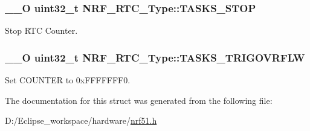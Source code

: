 \subsubsection[{T\+A\+S\+K\+S\+\_\+\+S\+T\+O\+P}]{\setlength{\rightskip}{0pt plus 5cm}\+\_\+\+\_\+\+O uint32\+\_\+t N\+R\+F\+\_\+\+R\+T\+C\+\_\+\+Type\+::\+T\+A\+S\+K\+S\+\_\+\+S\+T\+O\+P}\label{struct_n_r_f___r_t_c___type_a6c251ab88a855ba8c0b8ab21928b0cb2}
Stop R\+T\+C Counter. \hypertarget{struct_n_r_f___r_t_c___type_a08d8aef4b68b48e7ee8be18cbfc19665}{}
\subsubsection[{T\+A\+S\+K\+S\+\_\+\+T\+R\+I\+G\+O\+V\+R\+F\+L\+W}]{\setlength{\rightskip}{0pt plus 5cm}\+\_\+\+\_\+\+O uint32\+\_\+t N\+R\+F\+\_\+\+R\+T\+C\+\_\+\+Type\+::\+T\+A\+S\+K\+S\+\_\+\+T\+R\+I\+G\+O\+V\+R\+F\+L\+W}\label{struct_n_r_f___r_t_c___type_a08d8aef4b68b48e7ee8be18cbfc19665}
Set C\+O\+U\+N\+T\+E\+R to 0x\+F\+F\+F\+F\+F\+F\+F0. 

The documentation for this struct was generated from the following file\+:\begin{DoxyCompactItemize}
\item 
D\+:/\+Eclipse\+\_\+workspace/hardware/\hyperlink{nrf51_8h}{nrf51.\+h}\end{DoxyCompactItemize}
